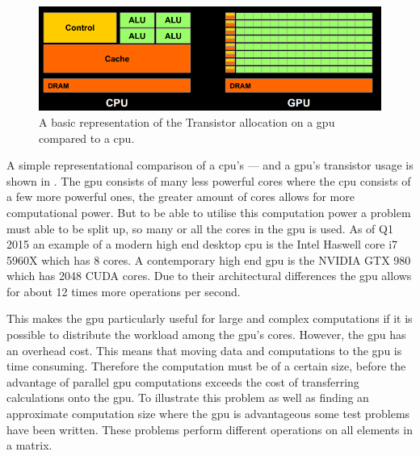 \begin{figure}[h!]
\centering
 \includegraphics[width=1\textwidth]{figures/GPUCPUimage.png} %
\caption{A basic representation of the Transistor allocation on a \acrshort{gpu} compared to a \acrshort{cpu}. \citep{NvidiaCUDASeminar}}\label{image:gpucpuimage}
\vspace{-15pt}
\end{figure}

A simple representational comparison of a \acrshort{cpu}'s --- and a \acrshort{gpu}'s transistor usage is shown in .
The \acrshort{gpu} consists of many less powerful cores where the \acrshort{cpu} consists of a few more powerful ones, the greater amount of cores allows for more computational power.
But to be able to utilise this computation power a problem must able to be split up, so many or all the cores in the \acrshort{gpu} is used.
As of Q1 2015 an example of a modern high end desktop \acrshort{cpu} is the Intel Haswell core i7 5960X which has 8 cores. \citep{puget}
A contemporary high end \acrshort{gpu} is the NVIDIA GTX 980 which has 2048 CUDA cores. \citep{techpowerup,gtx980}
Due to their architectural differences the \acrshort{gpu} allows for about 12 times more operations per second.

This makes the \acrshort{gpu} particularly useful for large and complex computations if it is possible to distribute the workload among the \acrshort{gpu}'s cores.
However, the \acrshort{gpu} has an overhead cost.
This means that moving data and computations to the \acrshort{gpu} is time consuming.
Therefore the computation must be of a certain size, before the advantage of parallel \acrshort{gpu} computations exceeds the cost of transferring calculations onto the \acrshort{gpu}.
To illustrate this problem as well as finding an approximate computation size where the \acrshort{gpu} is advantageous some test problems have been written. 
These problems perform different operations on all elements in a matrix. 

